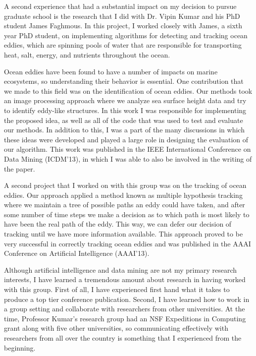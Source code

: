 \documentclass[12pt]{article}
\begin{document}
A second experience that had a substantial impact on my decision to pursue graduate school is the research that I did with Dr. Vipin Kumar and his PhD student James Faghmous. In this project, I worked closely with James, a sixth year PhD student, on implementing algorithms for detecting and tracking ocean eddies, which are spinning pools of water that are responsible for transporting heat, salt, energy, and nutrients throughout the ocean.

Ocean eddies have been found to have a number of impacts on marine ecosystems, so understanding their behavior is essential. One contribution that we made to this field was on the identification of ocean eddies. Our methods took an image processing approach where we analyze sea surface height data and try to identify eddy-like structures.  In this work I was responsible for implementing the proposed idea, as well as all of the code that was used to test and evaluate our methods. In addition to this, I was a part of the many discussions in which these ideas were developed and played a large role in designing the evaluation of our algorithm. This work was published in the IEEE International Conference on Data Mining (ICDM'13), in which I was able to also be involved in the writing of the paper.

A second project that I worked on with this group was on the tracking of ocean eddies.  Our approach applied a method known as multiple hypothesis tracking where we maintain a tree of possible paths an eddy could have taken, and after some number of time steps we make a decision as to which path is most likely to have been the real path of the eddy. This way, we can defer our decision of tracking until we have more information available. This approach proved to be very successful in correctly tracking ocean eddies and was published in the AAAI Conference on Artificial Intelligence (AAAI'13).

Although artificial intelligence and data mining are not my primary research interests, I have learned a tremendous amount about research in having worked with this group. First of all, I have experienced first hand what it takes to produce a top tier conference publication. Second, I have learned how to work in a group setting and collaborate with researchers from other universities. At the time, Professor Kumar's research group had an NSF Expeditions in Computing grant along with five other universities, so communicating effectively with researchers from all over the country is something that I experienced from the beginning.
\end{document}
